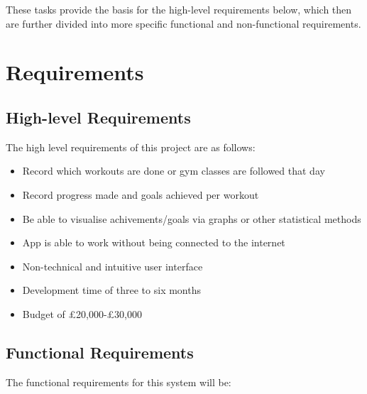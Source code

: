 \documentclass{article}
\begin{document}
These tasks provide the basis for the high-level requirements below, which then are further divided into more specific functional and non-functional requirements. 

\section{Requirements}

\subsection{High-level Requirements}

The high level requirements of this project are as follows:

\begin{itemize}

	\item Record which workouts are done or gym classes are followed that day
	\item Record progress made and goals achieved per workout
	\item Be able to visualise achivements/goals via graphs or other statistical methods
	\item App is able to work without being connected to the internet
	\item Non-technical and intuitive user interface
	\item Development time of three to six months
	\item Budget of \pounds20,000-\pounds30,000

\end{itemize}

\subsection{Functional Requirements}

The functional requirements for this system will be:
\end{document}
